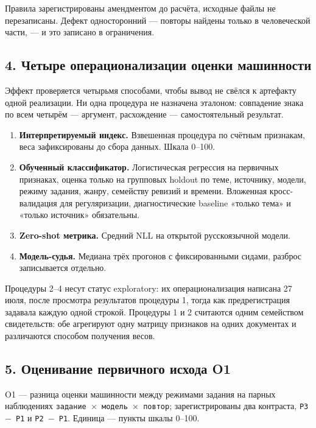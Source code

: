 \documentclass[11pt,a4paper]{article}
\renewcommand{\_}{\textunderscore\allowbreak}
\begin{document}
Правила зарегистрированы амендментом до расчёта, исходные файлы не перезаписаны.
Дефект односторонний — повторы найдены только в человеческой части, — и это
записано в ограничения.

\subsection{4. Четыре операционализации оценки машинности}

Эффект проверяется четырьмя способами, чтобы вывод не свёлся к артефакту одной
реализации. Ни одна процедура не назначена эталоном: совпадение знака по всем
четырём — аргумент, расхождение — самостоятельный результат.

\begin{enumerate}
\item[1.] \textbf{Интерпретируемый индекс.} Взвешенная процедура по счётным признакам, веса
   зафиксированы до сбора данных. Шкала 0–100.
\item[2.] \textbf{Обученный классификатор.} Логистическая регрессия на первичных признаках,
   оценка только на групповых holdout по теме, источнику, модели, режиму задания,
   жанру, семейству ревизий и времени. Вложенная кросс-валидация для
   регуляризации, диагностические baseline «только тема» и «только источник»
   обязательны.
\item[3.] \textbf{Zero-shot метрика.} Средний NLL на открытой русскоязычной модели.
\item[4.] \textbf{Модель-судья.} Медиана трёх прогонов с фиксированными сидами, разброс
   записывается отдельно.
\end{enumerate}

Процедуры 2–4 несут статус exploratory: их операционализация написана 27 июля,
после просмотра результатов процедуры 1, тогда как предрегистрация задавала каждую
одной строкой. Процедуры 1 и 2 считаются одним семейством свидетельств: обе
агрегируют одну матрицу признаков на одних документах и различаются способом
получения весов.

\subsection{5. Оценивание первичного исхода O1}

O1 — разница оценки машинности между режимами задания на парных наблюдениях
\texttt{задание $\times$ модель $\times$ повтор}; зарегистрированы два контраста, \texttt{P3 $-$ P1} и
\texttt{P2 $-$ P1}. Единица — пункты шкалы 0–100.
\end{document}
